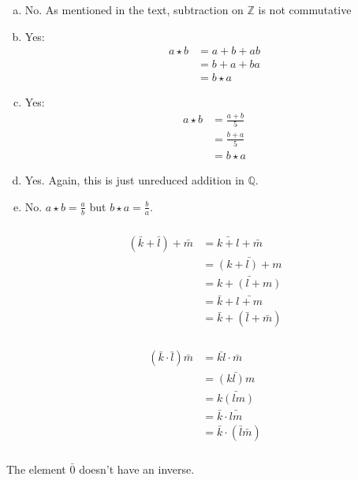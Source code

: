 \documentclass{article}
\newcommand{\ints}{\mathbb{Z}}
\newcommand{\rats}{\mathbb{Q}}
\newcommand{\mult}{\star}
\begin{document}
\subsubsection{}
\begin{enumerate}[(a)]
\item No. As mentioned in the text, subtraction on $\ints$ is not commutative
\item Yes:
\begin{align*}
a\mult b &= a+b+ab\\
&= b + a +ba\\
&= b\mult a
\end{align*}
\item Yes:
\begin{align*}
a\mult b &= \frac{a+b}{5}\\
&= \frac{b+a}{5}\\
&= b\mult a
\end{align*}
\item Yes. Again, this is just unreduced addition in $\rats$. 
\item No. $a \mult b = \frac{a}{b}$ but $b \mult a = \frac{b}{a}$.
\end{enumerate}
\subsubsection{}
\begin{align*}
(\bar k + \bar l) + \bar m 
&= \bar{k+l} + \bar m\\
&= \bar{(k+l)+m}\\
&= \bar{k+(l+m)}\\
&= \bar k + \bar{l+m}\\
&= \bar k + (\bar l + \bar m)
\end{align*}
\subsubsection{}
\begin{align*}
(\bar k \cdot \bar l) \bar m 
&= \bar{kl} \cdot \bar m\\
&= \bar{(kl)m}\\
&= \bar{k(lm)}\\
&= \bar k \cdot \bar{lm}\\
&= \bar k \cdot (\bar l  \bar m)
\end{align*}
\subsubsection{}
The element $\bar 0$ doesn't have an inverse.
\end{document}
